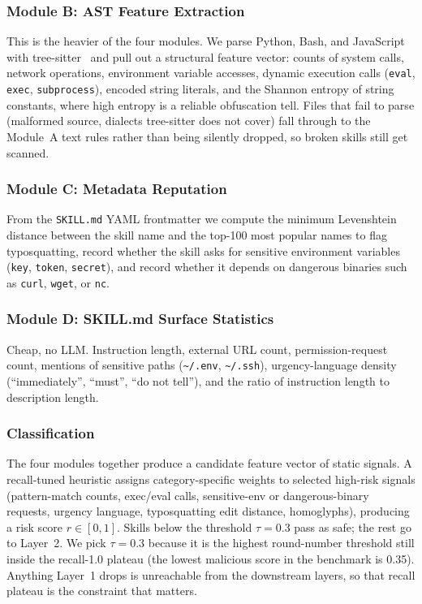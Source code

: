 \documentclass[sigconf,nonacm]{acmart}
\begin{document}
\subsubsection{Module B: AST Feature Extraction}
This is the heavier of the four modules. We parse Python, Bash, and JavaScript with tree-sitter~\cite{treesitter} and pull out a structural feature vector: counts of system calls, network operations, environment variable accesses, dynamic execution calls (\texttt{eval}, \texttt{exec}, \texttt{subprocess}), encoded string literals, and the Shannon entropy of string constants, where high entropy is a reliable obfuscation tell. Files that fail to parse (malformed source, dialects tree-sitter does not cover) fall through to the Module~A text rules rather than being silently dropped, so broken skills still get scanned.

\subsubsection{Module C: Metadata Reputation}
From the \texttt{SKILL.md} YAML frontmatter we compute the minimum Levenshtein distance between the skill name and the top-100 most popular names to flag typosquatting, record whether the skill asks for sensitive environment variables (\texttt{key}, \texttt{token}, \texttt{secret}), and record whether it depends on dangerous binaries such as \texttt{curl}, \texttt{wget}, or \texttt{nc}.

\subsubsection{Module D: SKILL.md Surface Statistics}
Cheap, no LLM. Instruction length, external URL count, permission-request count, mentions of sensitive paths (\texttt{\~{}/.env}, \texttt{\~{}/.ssh}), urgency-language density (``immediately'', ``must'', ``do not tell''), and the ratio of instruction length to description length.

\subsubsection{Classification}
The four modules together produce a candidate feature vector of static signals. A recall-tuned heuristic assigns category-specific weights to selected high-risk signals (pattern-match counts, exec/eval calls, sensitive-env or dangerous-binary requests, urgency language, typosquatting edit distance, homoglyphs), producing a risk score $r \in [0, 1]$. Skills below the threshold $\tau = 0.3$ pass as safe; the rest go to Layer~2. We pick $\tau = 0.3$ because it is the highest round-number threshold still inside the recall-1.0 plateau (the lowest malicious score in the benchmark is 0.35). Anything Layer~1 drops is unreachable from the downstream layers, so that recall plateau is the constraint that matters.
\end{document}
